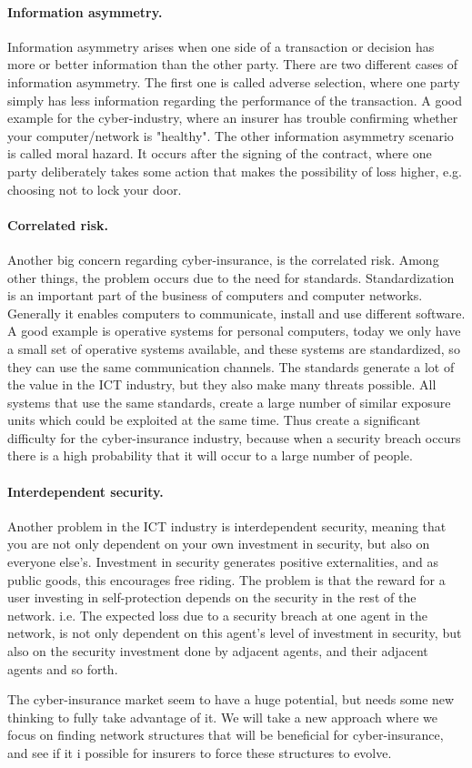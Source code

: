 \paragraph{Information asymmetry.}
Information asymmetry arises when one side of a transaction or decision has more or better information than the other party. There are two different cases of information asymmetry. The first one is called adverse selection, where one party simply has less information regarding the performance of the transaction. A good example for the cyber-industry, where an insurer has trouble confirming whether your computer/network is "healthy".
The other information asymmetry scenario is called moral hazard. It occurs after the signing of the contract, where one party deliberately takes some action that makes the possibility of loss higher, e.g. choosing not to lock your door. 
      
\paragraph{Correlated risk.}

Another big concern regarding cyber-insurance, is the correlated risk. Among other things, the problem occurs due to the need for standards. Standardization is an important part of the business of computers and computer networks. Generally it enables computers to communicate, install and use different software. A good example is operative systems for personal computers, today we only have a small set of operative systems available, and these systems are standardized, so they can use the same communication channels. The standards generate a lot of the value in the ICT industry, but they also make many threats possible. All systems that use the same standards, create a large number of similar exposure units which could be exploited at the same time. 
Thus create a significant difficulty for the cyber-insurance industry, because when a security breach occurs there is a high probability that it will occur to a large number of people.
 
 \paragraph{Interdependent security.}
Another problem in the ICT industry is interdependent security, meaning that you are not only dependent on your own investment in security, but also on everyone else's. 
Investment in security generates positive externalities, and as public goods, this encourages free riding. The problem is that the reward for a user investing in self-protection depends on the security in the rest of the network. i.e. The expected loss due to a security breach at one agent in the network, is not only dependent on this agent's level of investment in security, but also on the security investment done by adjacent agents, and their adjacent agents and so forth.
  
The cyber-insurance market seem to have a huge potential, but needs some new thinking to fully take advantage of it. We will take a new approach where we focus on finding network structures that will be beneficial for cyber-insurance, and see if it i possible for insurers to force these structures to evolve.

